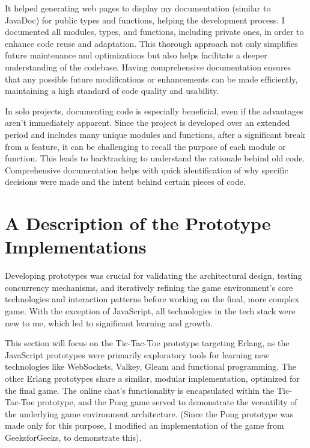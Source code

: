 \documentclass[]{final}
\begin{document}
It helped generating web pages to display my documentation (similar to JavaDoc)
for public types and functions, helping the development process.
I documented all modules, types, and functions, including private ones,
in order to enhance code reuse and adaptation. This thorough approach not
only simplifies future maintenance and optimizations but also helps facilitate a
deeper understanding of the codebase.
Having comprehensive documentation
ensures that any possible future modifications or enhancements can be made
efficiently, maintaining a high standard of code quality and usability.

In solo projects, documenting code is especially beneficial, even if the advantages
aren't immediately apparent. Since the project is developed over an extended period
and includes many unique modules and functions, after a significant break from a
feature, it can be challenging to recall the purpose of each module or function.
This leads to backtracking to understand the rationale behind old code.
Comprehensive documentation helps with quick identification of why specific decisions
were made and the intent behind certain pieces of code.

\chapter{A Description of the Prototype Implementations}

Developing prototypes was crucial for validating the architectural design,
testing concurrency mechanisms, and iteratively refining the game environment's
core technologies and interaction patterns before working on the final,
more complex game. With the exception of JavaScript,
all technologies in the tech stack were new to me, which led to
significant learning and growth.

This section will focus on the Tic-Tac-Toe prototype targeting Erlang,
as the JavaScript prototypes were primarily exploratory tools for learning
new technologies like WebSockets, Valkey, Gleam and functional programming.
The other Erlang prototypes share a similar, modular implementation,
optimized for the final game. The online chat's functionality is
encapsulated within the Tic-Tac-Toe prototype, and the Pong game
served to demonstrate the versatility of the underlying game
environment architecture. (Since the Pong prototype was made only for this purpose,
I modified an implementation of the game from GeeksforGeeks, to demonstrate this).\cite{GeeksforGeeks_pong_2021}
\end{document}
